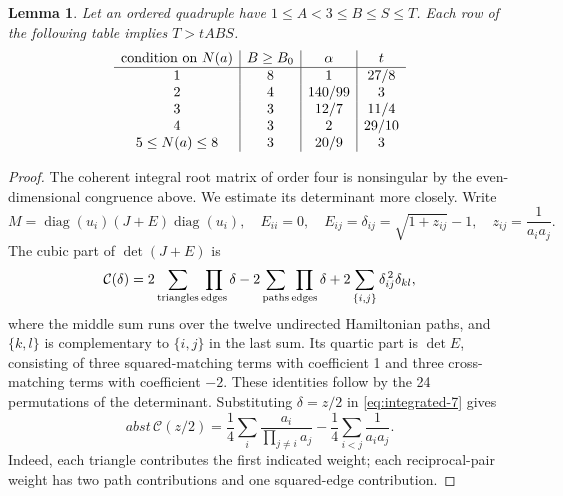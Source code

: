 \documentclass[12pt]{article}
\newtheorem{lemma}[theorem]{Lemma}
\numberwithin{equation}{section}
\begin{document}
\begin{lemma}\label{lem:five-frontier-gaps}
Let an ordered quadruple have \(1\le A<3\le B\le S\le T\).
Each row of the following table implies \(T>tABS\).
\[
\begin{array}{c|c|c|c}
\hbox{condition on }N(a)&B\ge B_0&\alpha&t\\\hline
1&8&1&27/8\\
2&4&140/99&3\\
3&3&12/7&11/4\\
4&3&2&29/10\\
5\le N(a)\le8&3&20/9&3
\end{array}
\]
\end{lemma}
\begin{proof}
The coherent integral root matrix of order four is nonsingular by the
even-dimensional congruence above. We estimate its determinant more
closely. Write
\[
 M=\operatorname{diag}(u_i)(J+E)\operatorname{diag}(u_i),\quad
 E_{ii}=0,\quad E_{ij}=\delta_{ij}
 =\sqrt{1+z_{ij}}-1,\quad z_{ij}=\frac1{a_i a_j}.
\]
The cubic part of \(\det(J+E)\) is
\begin{equation}\label{eq:integrated-7}
\mathcal C(\delta)=
 2\sum_{\rm triangles}\prod_{\rm edges}\delta
 -2\sum_{\rm paths}\prod_{\rm edges}\delta
 +2\sum_{\{i,j\}}\delta_{ij}^{\,2}\delta_{kl},
\end{equation}
where the middle sum runs over the twelve undirected Hamiltonian paths,
and \(\{k,l\}\) is complementary to \(\{i,j\}\) in the last sum.
Its quartic part is \(\det E\), consisting of three squared-matching
terms with coefficient 1 and three cross-matching terms with coefficient
\(-2\). These identities follow by the 24 permutations of the determinant.
Substituting \(\delta=z/2\) in \eqref{eq:integrated-7} gives
\begin{equation}\label{eq:integrated-8}
abst\,\mathcal C(z/2)
 =\frac14\sum_i\frac{a_i}{\prod_{j\ne i}a_j}
                  -\frac14\sum_{i<j}\frac1{a_i a_j}.
\end{equation}
Indeed, each triangle contributes the first indicated weight; each
reciprocal-pair weight has two path contributions and one squared-edge
contribution.


\end{proof}
\end{document}
